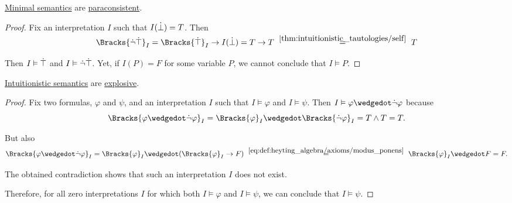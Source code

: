 \begin{proposition}\label{thm:minimal_semantics_are_paraconsistent}
  \hyperref[def:minimal_propositional_semantics]{Minimal semantics} are \hyperref[def:paraconsistent_consequence_operator]{paraconsistent}.
\end{proposition}
\begin{proof}
  Fix an interpretation \( I \) such that \( I(\dot\bot) = T \). Then
  \begin{equation*}
    \Bracks{\synneg \syntop}_I
    =
    \Bracks{\syntop}_I \rightarrow I(\synbot)
    =
    T \rightarrow T
    \reloset {\ref{thm:intuitionistic_tautologies/self}} =
    T
  \end{equation*}

  Then \( I \vDash \dot\top \) and \( I \vDash \dot\neg \dot\top \). Yet, if \( I(P) = F \) for some variable \( P \), we cannot conclude that \( I \vDash P \).
\end{proof}

\begin{proposition}\label{thm:intuitionistic_semantics_are_explosive}
  \hyperref[def:propositional_semantics]{Intuitionistic semantics} are \hyperref[def:paraconsistent_consequence_operator]{explosive}.
\end{proposition}
\begin{proof}
  Fix two formulas, \( \varphi \) and \( \psi \), and an interpretation \( I \) such that \( I \vDash \varphi \) and \( I \vDash \psi \). Then \( I \vDash \varphi \synwedge \synneg \varphi \) because
  \begin{equation*}
    \Bracks{\varphi \synwedge \synneg \varphi}_I
    =
    \Bracks{\varphi}_I \synwedge \Bracks{\synneg \varphi}_I
    =
    T \wedge T
    =
    T.
  \end{equation*}

  But also
  \begin{equation*}
    \Bracks{\varphi \synwedge \synneg \varphi}_I
    =
    \Bracks{\varphi}_I \synwedge (\Bracks{\varphi}_I \rightarrow F)
    \reloset {\eqref{eq:def:heyting_algebra/axioms/modus_ponens}} =
    \Bracks{\varphi}_I \synwedge F
    =
    F.
  \end{equation*}

  The obtained contradiction shows that such an interpretation \( I \) does not exist.

  Therefore, for all zero interpretations \( I \) for which both \( I \vDash \varphi \) and \( I \vDash \psi \), we can conclude that \( I \vDash \psi \).
\end{proof}

